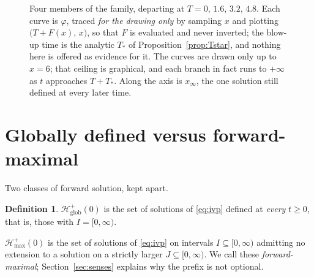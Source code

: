 \documentclass[12pt]{article}
\theoremstyle{plain}
\theoremstyle{definition}
\newtheorem{definition}[theorem]{Definition}
\theoremstyle{remark}
\newcommand{\Hglob}{\mathcal{H}^{+}_{\mathrm{glob}}}
\newcommand{\Hmax}{\mathcal{H}^{+}_{\max}}
\begin{document}
\begin{figure}[t]
\centering
{}
\caption{Four members of the family, departing at $T=0,\,1.6,\,3.2,\,4.8$. Each
curve is $\varphi$, traced \emph{for the drawing only} by sampling $x$ and
plotting $\big(T+F(x),\,x\big)$, so that $F$ is evaluated and never inverted;
the blow-up time is the analytic $T_{*}$ of
Proposition~\ref{prop:Tstar}, and nothing here is offered as evidence for it.
The curves are drawn only up to $x=6$; that ceiling is graphical, and each
branch in fact runs to $+\infty$ as $t$ approaches $T+T_{*}$. Along the axis is
$x_{\infty}$, the one solution still defined at every later time.}
\label{fig:branches}
\end{figure}

\section{Globally defined versus forward-maximal}\label{sec:counts}

Two classes of forward solution, kept apart.

\begin{definition}\label{def:classes}
$\Hglob(0)$ is the set of solutions of \eqref{eq:ivp} defined at \emph{every}
$t\ge0$, that is, those with $I=[0,\infty)$.

$\Hmax(0)$ is the set of solutions of \eqref{eq:ivp} on intervals
$I\subseteq[0,\infty)$ admitting no extension to a solution on a strictly larger
$J\subseteq[0,\infty)$. We call these \emph{forward-maximal};
Section~\ref{sec:senses} explains why the prefix is not optional.
\end{definition}
\end{document}
